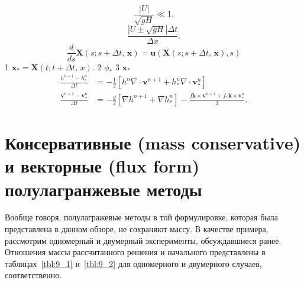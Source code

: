 %
%
\begin{equation}
\label{eq:equation8_5}
\frac{|U|}{\sqrt{gH}} \ll 1.
\end{equation}
%
%
\begin{equation}
\label{eq:equation8_6}
\frac{|U\pm\sqrt{gH}|\Delta t}{\Delta x}.
\end{equation}
%
%
\begin{equation}
\label{eq:equation8_7}
\frac{d}{ds}\mathbf{X}(s;s+\Delta t,\,\mathbf{x})=\mathbf{u}(\mathbf{X}(s;s+\Delta t,\,\mathbf{x}), s)
\end{equation}
%
1 $\mathbf{x}_{*}=\mathbf{X}(t; t + \Delta t,\,x).$ 2 $\phi_*$ 3 $\mathbf{x}_*$
%
\begin{align}
\label{eq:equation8_8}
\frac{h^{n+1}-h_{*}^n}{\Delta t}&=-\frac{1}{2} [h^n\nabla \cdot \mathbf{v}^{n+1} + h_*^n \nabla \cdot \mathbf{v}_{*}^n] \\
\label{eq:equation8_9}
\frac{\mathbf{v}^{n+1}-\mathbf{v}_{*}^n}{\Delta t}&=-\frac{g}{2}[\nabla h^{n+1}+\nabla h_{*}^n] - \frac{f\mathbf{k}\times\mathbf{v}^{n+1}+f_{*}\mathbf{k}\times\mathbf{v}_{*}^n}{2}.
\end{align}
%
\chapter{Консервативные (mass conservative) и векторные (flux form) полулагранжевые методы} \label{chapt_9}
Вообще говоря, полулагражевые методы в той формулировке, которая была представлена в данном обзоре, не сохраняют массу. В качестве примера, рассмотрим одномерный и двумерный эксперименты, обсуждавшиеся ранее. Отношения массы рассчитанного решения и начального представлены в таблицах~\ref{tbl:9_1} и~\ref{tbl:9_2} для одномерного и двумерного случаев, соответственно.

